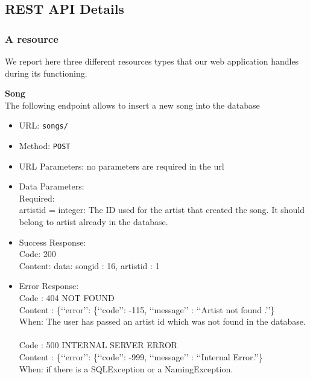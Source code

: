 \subsection{REST API Details}


\subsubsection*{A resource}


We report here three different resources types that our web application handles during its functioning.

\textbf{Song}\\
The following endpoint allows to insert a new song into the database
\begin{itemize}
    \item URL: \texttt{songs/}
    \item Method: \texttt{POST}
    \item URL Parameters: no parameters are required in the url
    \item Data Parameters: \\
Required:\\
artistid  = {integer}: The ID used for the artist that created the song. It should belong to artist already in the database.
    \item Success Response:\\
Code: 200\\
Content: {data: {songid : 16, artistid : 1}}
    \item Error Response:\\
Code : 404 NOT FOUND\\
Content : \{‘‘error’’: \{‘‘code’’: -115, ‘‘message’’ : ‘‘Artist not found .’’\} \\
When: The user has passed an artist id which was not found in the database. \\\\
Code : 500 INTERNAL SERVER ERROR\\
Content : \{‘‘error’’: \{‘‘code’’: -999, ‘‘message’’ : ‘‘Internal Error.’’\} \\
When: if there is a SQLException or a NamingException. \\

\end{itemize}

